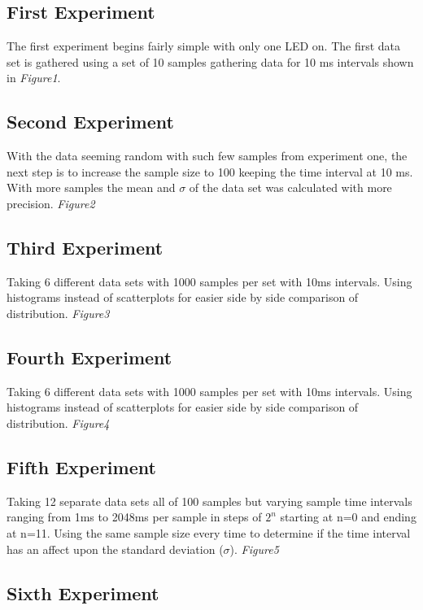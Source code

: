 \documentclass[12 pt,twoside]{article}
\begin{document}
\subsection{First Experiment}
The first experiment begins fairly simple with only one LED on. The first data set is gathered using a  set of 10 samples gathering data for 10 ms intervals shown in {\it Figure1}.

\subsection{Second Experiment}
With the data seeming random with such few samples from experiment one, the next step is to increase the sample size to 100 keeping the time interval at 10 ms. With more samples the mean and $\sigma$ of the data set was calculated with more precision. {\it Figure2}

\subsection{Third Experiment}

Taking 6 different data sets with 1000 samples per set with 10ms intervals. Using histograms instead of scatterplots for easier side by side comparison of distribution. {\it Figure3}

\subsection{Fourth Experiment}

Taking 6 different data sets with 1000 samples per set with 10ms intervals. Using histograms instead of scatterplots for easier side by side comparison of distribution. {\it Figure4}

\subsection{Fifth Experiment}

Taking 12 separate data sets all of 100 samples but varying sample time intervals ranging from 1ms to 2048ms per sample in steps of $2^n$ starting at n=0 and ending at n=11. Using the same sample size every time to determine if the time interval has an affect upon the standard deviation ($\sigma$). {\it Figure5}
 
\subsection{Sixth Experiment}
\end{document}

